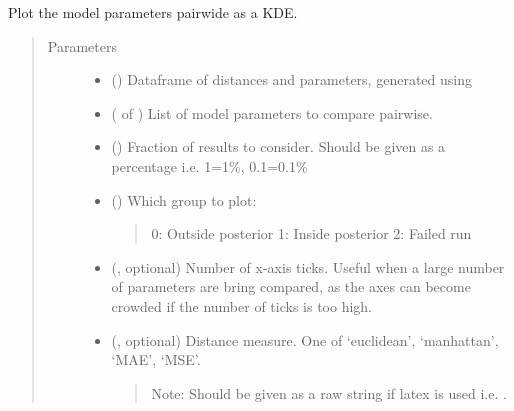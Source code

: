 \documentclass[letterpaper,10pt,english]{sphinxmanual}
\begin{document}

\begin{fulllineitems}
\label{\detokenize{misc:bayescmd.results_handling.kde_plot}}
Plot the model parameters pairwide as a KDE.
\begin{quote}\begin{description}
\item[{Parameters}] \leavevmode\begin{itemize}
\item {} 
 () \textendash{} Dataframe of distances and parameters, generated using
{\hyperref[\detokenize{misc:bayescmd.results_handling.data_import}]{}}

\item {} 
 ( of ) \textendash{} List of model parameters to compare pairwise.

\item {} 
 () \textendash{} Fraction of results to consider. Should be given as a percentage i.e.
1=1\%, 0.1=0.1\%

\item {} 
 () \textendash{} 
Which group to plot:
\begin{quote}

0: Outside posterior
1: Inside posterior
2: Failed run
\end{quote}


\item {} 
 (, optional) \textendash{} Number of x-axis ticks. Useful when a large number of parameters are
bring compared, as the axes can become crowded if the number of ticks
is too high.

\item {} 
 (, optional) \textendash{} 
Distance measure. One of ‘euclidean’, ‘manhattan’, ‘MAE’, ‘MSE’.
\begin{quote}

Note: Should be given  as a raw string if latex is used i.e.
.
\end{quote}



\end{itemize}
\end{description}
\end{quote}
\end{fulllineitems}
\end{document}
